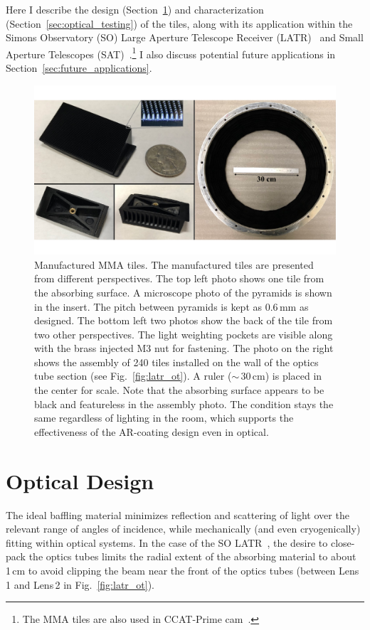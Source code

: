 Here I describe the design (Section~\ref{sec:optical_design}) and characterization (Section~\ref{sec:optical_testing}) of the tiles, along with its application within the Simons Observatory (SO) Large Aperture Telescope Receiver (LATR)~\cite{zhu18, orlo18} and Small Aperture Telescopes (SAT)~\cite{ali20}.\footnote{The MMA tiles are also used in CCAT-Prime cam~\cite{vavgiakis/etal:2018}.}  I also discuss potential future applications in Section~\ref{sec:future_applications}.

\begin{figure}[t]
    \centering
    \includegraphics[width = \textwidth]{Figures/real_tile.pdf}
    \caption{Manufactured MMA tiles. The manufactured tiles are presented from different perspectives. The top left photo shows one tile from the absorbing surface. A microscope photo of the pyramids is shown in the insert. The pitch between pyramids is kept as 0.6\,mm as designed. The bottom left two photos show the back of the tile from two other perspectives. The light weighting pockets are visible along with the brass injected M3 nut for fastening. The photo on the right shows the assembly of 240 tiles installed on the wall of the optics tube section (see Fig.~\ref{fig:latr_ot}). A ruler ($\sim$\,30\,cm) is placed in the center for scale. Note that the absorbing surface appears to be black and featureless in the assembly photo. The condition stays the same regardless of lighting in the room, which supports the effectiveness of the AR-coating design even in optical.}
    \label{fig:real_tile}
\end{figure}
\section{Optical Design}
\label{sec:optical_design}

The ideal baffling material minimizes reflection and scattering of light over the relevant range of angles of incidence, while mechanically (and even cryogenically) fitting within optical systems.  In the case of the SO LATR~\cite{xu/etal:2020c, zhu18, orlo18, coppi/etal:2018}, the desire to close-pack the optics tubes limits the radial extent of the absorbing material to about 1\,cm to avoid clipping the beam near the front of the optics tubes (between Lens\,1 and Lens\,2 in Fig.~\ref{fig:latr_ot}).



